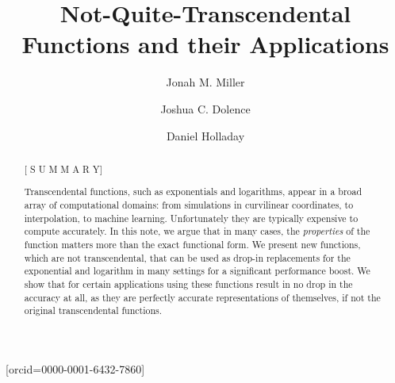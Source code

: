 \documentclass[a4paper,fleqn]{cas-sc}
\begin{document}
\let\WriteBookmarks\relax
\def\floatpagepagefraction{1}
\def\textpagefraction{.001}



\title[mode = title]{Not-Quite-Transcendental Functions and their Applications}

\author[1,2]{Jonah M. Miller}[orcid=0000-0001-6432-7860]
\fnmark[1] 
\author[1,2]{Joshua C. Dolence}
\fnmark[2] 
\author[3]{Daniel Holladay}
\fnmark[3]



\begin{abstract}[ S U M M A R Y]

  Transcendental functions, such as exponentials and logarithms,
  appear in a broad array of computational domains: from simulations
  in curvilinear coordinates, to interpolation, to machine
  learning. Unfortunately they are typically expensive to compute
  accurately. In this note, we argue that in many cases, the
  \textit{properties} of the function matters more than the exact
  functional form. We present new functions, which are not
  transcendental, that can be used as drop-in replacements for the
  exponential and logarithm in many settings for a significant
  performance boost. We show that for certain applications using these
  functions result in no drop in the accuracy at all, as they are
  perfectly accurate representations of themselves, if not the
  original transcendental functions.

\end{abstract}


\end{document}
